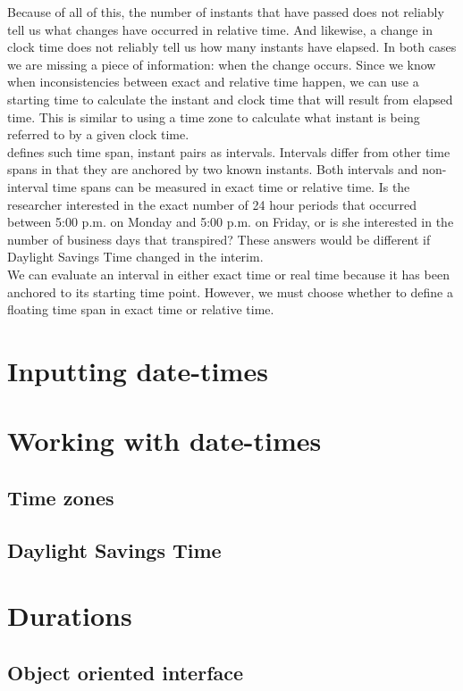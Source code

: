 \documentclass[article]{jss}
\begin{document}
Because of all of this, the number of instants that have passed does not reliably tell us what changes have occurred in relative time. And likewise, a change in clock time does not reliably tell us how many instants have elapsed. In both cases we are missing a piece of information: when the change occurs. Since we know when inconsistencies between exact and relative time happen, we can use a starting time to calculate the instant and clock time that will result from elapsed time. This is similar to using a time zone to calculate what instant is being referred to by a given clock time.\\

 defines such time span, instant pairs as intervals. Intervals differ from other time spans in that they are anchored by two known instants. Both intervals and non-interval time spans can be measured in exact time or relative time. Is the researcher interested in the exact number of 24 hour periods that occurred between 5:00 p.m. on Monday and 5:00 p.m. on Friday, or is she interested in the number of business days that transpired? These answers would be different if Daylight Savings Time changed in the interim.\\

We can evaluate an interval in either exact time or real time because it has been anchored to its starting time point. However, we must choose whether to define a floating time span in exact time or relative time.


\section{Inputting date-times}
\section{Working with date-times}
\subsection{Time zones}
\subsection{Daylight Savings Time}
\section{Durations}
\subsection{Object oriented interface}
\end{document}
